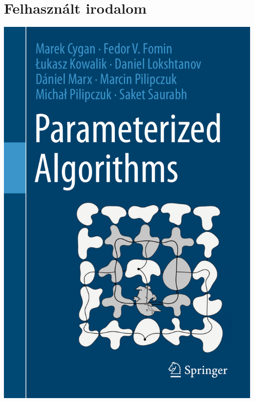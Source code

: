 \documentclass[aspectratio=169]{beamer}
\begin{document}
\section{Felhasznált irodalom}
\begin{frame}
\begin{center}
\includegraphics[height=0.9\textheight]{book.png}
\end{center}
\end{frame}
\end{document}
